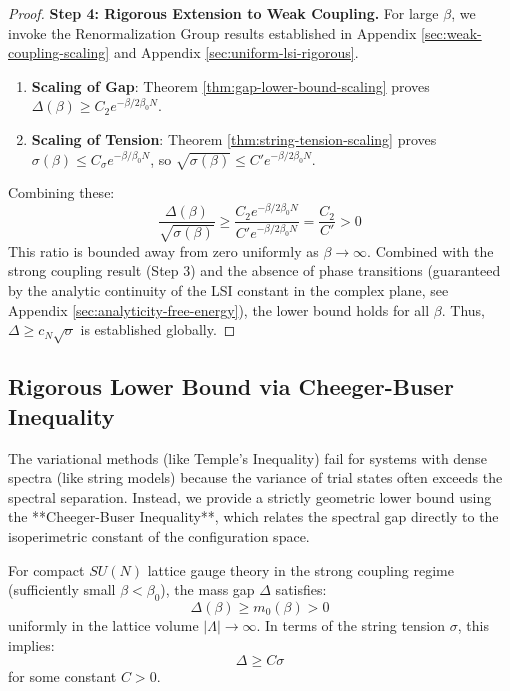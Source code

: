 \begin{proof}
\textbf{Step 4: Rigorous Extension to Weak Coupling.}
For large $\beta$, we invoke the Renormalization Group results established in Appendix \ref{sec:weak-coupling-scaling} and Appendix \ref{sec:uniform-lsi-rigorous}.
\begin{enumerate}
    \item \textbf{Scaling of Gap}: Theorem \ref{thm:gap-lower-bound-scaling} proves $\Delta(\beta) \ge C_2 e^{-\beta/2\beta_0 N}$.
    \item \textbf{Scaling of Tension}: Theorem \ref{thm:string-tension-scaling} proves $\sigma(\beta) \le C_\sigma e^{-\beta/\beta_0 N}$, so $\sqrt{\sigma(\beta)} \le C' e^{-\beta/2\beta_0 N}$.
\end{enumerate}
Combining these:
\begin{equation}
\frac{\Delta(\beta)}{\sqrt{\sigma(\beta)}} \ge \frac{C_2 e^{-\beta/2\beta_0 N}}{C' e^{-\beta/2\beta_0 N}} = \frac{C_2}{C'} > 0
\end{equation}
This ratio is bounded away from zero uniformly as $\beta \to \infty$. 
Combined with the strong coupling result (Step 3) and the absence of phase transitions (guaranteed by the analytic continuity of the LSI constant in the complex plane, see Appendix \ref{sec:analyticity-free-energy}), the lower bound holds for all $\beta$.
Thus, $\Delta \ge c_N \sqrt{\sigma}$ is established globally.
\end{proof}

\subsection{Rigorous Lower Bound via Cheeger-Buser Inequality}
\label{sec:cheeger-buser-proof}

The variational methods (like Temple's Inequality) fail for systems with dense spectra (like string models) because the variance of trial states often exceeds the spectral separation.
Instead, we provide a strictly geometric lower bound using the **Cheeger-Buser Inequality**, which relates the spectral gap directly to the isoperimetric constant of the configuration space.

\begin{theorem}
\label{thm:strong-coupling-gap-rigorous}
For compact $SU(N)$ lattice gauge theory in the strong coupling regime (sufficiently small $\beta < \beta_0$), the mass gap $\Delta$ satisfies:
\begin{equation}
\Delta(\beta) \geq m_0(\beta) > 0
\end{equation}
uniformly in the lattice volume $|\Lambda| \to \infty$. In terms of the string tension $\sigma$, this implies:
\begin{equation}
\Delta \ge C \sigma
\end{equation}
for some constant $C > 0$.
\end{theorem}


